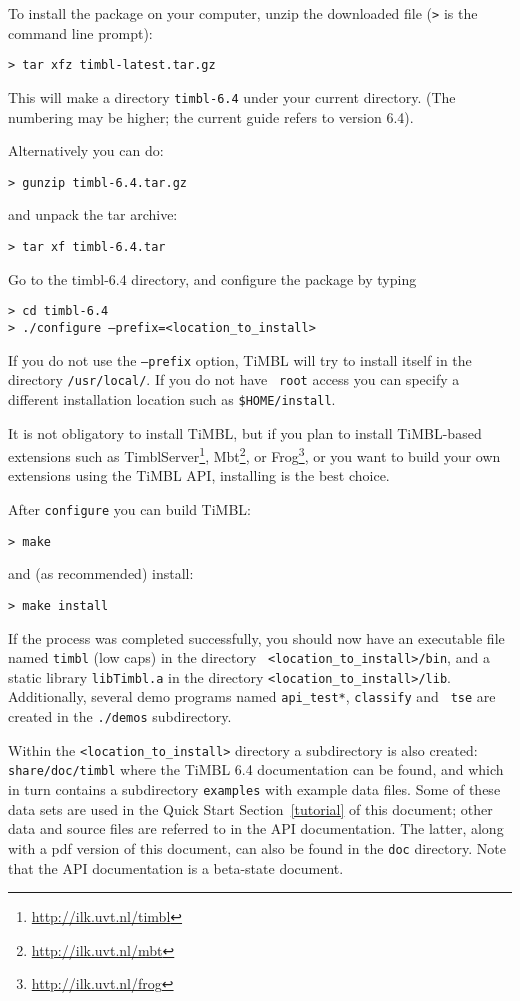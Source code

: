 \documentclass{book}
\begin{document}
To install the package on your computer, unzip the downloaded file ({\tt >} is the command line prompt):

{\tt > tar xfz timbl-latest.tar.gz}

This will make a directory {\tt timbl-6.4} under your current
directory. (The numbering may be higher; the current guide refers to
version 6.4).

Alternatively you can do:

{\tt > gunzip timbl-6.4.tar.gz}

and unpack the tar archive:

{\tt > tar xf timbl-6.4.tar}

Go to the timbl-6.4 directory, and configure the package by typing

{\tt > cd timbl-6.4} \\
{\tt > ./configure --prefix=<location\_to\_install>}

If you do not use the {\tt --prefix} option, TiMBL will try to install
itself in the directory {\tt /usr/local/}.  If you do not have {\tt
  root} access you can specify a different installation location such
as {\tt \$HOME/install}.

It is not obligatory to install TiMBL, but if you plan to install
TiMBL-based extensions such as
TimblServer\footnote{\url{http://ilk.uvt.nl/timbl}},
Mbt\footnote{\url{http://ilk.uvt.nl/mbt}}, or
Frog\footnote{\url{http://ilk.uvt.nl/frog}}, or you want to
build your own extensions using the TiMBL API, installing is the best
choice.

After {\tt configure} you can build TiMBL:

{\tt > make}

and (as recommended) install:

{\tt > make install }

If the process was completed successfully, you should now have an
executable file named {\tt timbl} (low caps) in the directory {\tt
  <location\_to\_install>/bin}, and a static library {\tt libTimbl.a}
in the directory {\tt <location\_to\_install>/lib}.  Additionally,
several demo programs named {\tt api\_test*}, {\tt classify} and {\tt
  tse} are created in the {\tt ./demos} subdirectory.

Within the {\tt <location\_to\_install>} directory a subdirectory is
also created: {\tt share/doc/timbl} where the TiMBL 6.4 documentation
can be found, and which in turn contains a subdirectory {\tt examples}
with example data files. Some of these data sets are used in the Quick
Start Section~\ref{tutorial} of this document; other data and source
files are referred to in the API documentation. The latter, along with
a pdf version of this document, can also be found in the {\tt doc}
directory. Note that the API documentation is a beta-state document.
\end{document}
